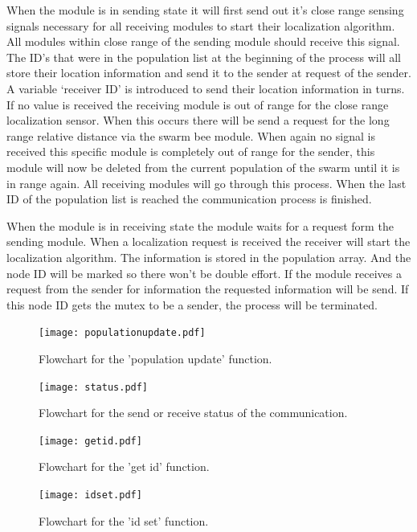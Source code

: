 \documentclass[10pt,a4paper]{article}
\begin{document}
When the module is in sending state it will first send out it’s close range sensing signals necessary for all receiving modules to start their localization algorithm. All modules within close range of the sending module should receive this signal. 
The ID’s that were in the population list at the beginning of the process will all store their location information and send it to the sender at request of the sender. A variable ‘receiver ID’ is introduced to send their location information in turns. If no value is received the receiving module is out of range for the close range localization sensor. When this occurs there will be send a request for the long range relative distance via the swarm bee module. When again no signal is received this specific module is completely out of range for the sender, this module will now be deleted from the current population of the swarm until it is in range again.
All receiving modules will go through this process. When the last ID of the population list is reached the communication process is finished.

When the module is in receiving state the module waits for a request form the sending module. When a localization request is received the receiver will start the localization algorithm. The information is stored in the population array. And the node ID will be marked so there won’t be double effort. If the module receives a request from the sender for information the requested information will be send.
If this node ID gets the mutex to be a sender, the process will be terminated.

\begin{figure}[H]
   \centering
   \texttt{[image: populationupdate.pdf]}
   \caption{Flowchart for the 'population update' function.}
   \label{fig:populationupdate}
\end{figure}


\begin{figure}[H]
   \centering
   \texttt{[image: status.pdf]}
   \caption{Flowchart for the send or receive status of the communication.}
   \label{fig:status}
\end{figure}



\begin{figure}[H]
   \centering
   \texttt{[image: getid.pdf]}
   \caption{Flowchart for the 'get id' function.}
   \label{fig:getid}
\end{figure}

\begin{figure}[H]
   \centering
   \texttt{[image: idset.pdf]}
   \caption{Flowchart for the 'id set' function.}
   \label{fig:idset}
\end{figure}
\end{document}
